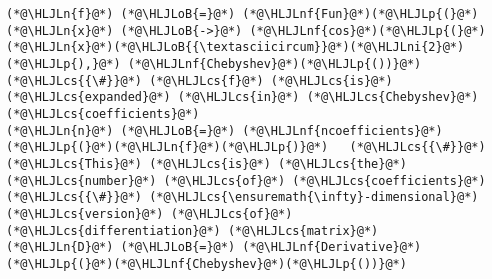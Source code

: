\documentclass[12pt,a4paper]{article}
\newcommand{\HLJLn}[1]{#1}
\newcommand{\HLJLnf}[1]{\textcolor[RGB]{66,102,213}{#1}}
\newcommand{\HLJLni}[1]{\textcolor[RGB]{59,151,46}{#1}}
\newcommand{\HLJLoB}[1]{\textcolor[RGB]{102,102,102}{\textbf{#1}}}
\newcommand{\HLJLp}[1]{#1}
\newcommand{\HLJLcs}[1]{\textcolor[RGB]{153,153,119}{\textit{#1}}}
\begin{document}
\begin{lstlisting}
(*@\HLJLn{f}@*) (*@\HLJLoB{=}@*) (*@\HLJLnf{Fun}@*)(*@\HLJLp{(}@*)(*@\HLJLn{x}@*) (*@\HLJLoB{->}@*) (*@\HLJLnf{cos}@*)(*@\HLJLp{(}@*)(*@\HLJLn{x}@*)(*@\HLJLoB{{\textasciicircum}}@*)(*@\HLJLni{2}@*)(*@\HLJLp{),}@*) (*@\HLJLnf{Chebyshev}@*)(*@\HLJLp{())}@*)   (*@\HLJLcs{{\#}}@*) (*@\HLJLcs{f}@*) (*@\HLJLcs{is}@*) (*@\HLJLcs{expanded}@*) (*@\HLJLcs{in}@*) (*@\HLJLcs{Chebyshev}@*) (*@\HLJLcs{coefficients}@*)
(*@\HLJLn{n}@*) (*@\HLJLoB{=}@*) (*@\HLJLnf{ncoefficients}@*)(*@\HLJLp{(}@*)(*@\HLJLn{f}@*)(*@\HLJLp{)}@*)   (*@\HLJLcs{{\#}}@*) (*@\HLJLcs{This}@*) (*@\HLJLcs{is}@*) (*@\HLJLcs{the}@*) (*@\HLJLcs{number}@*) (*@\HLJLcs{of}@*) (*@\HLJLcs{coefficients}@*)
(*@\HLJLcs{{\#}}@*) (*@\HLJLcs{\ensuremath{\infty}-dimensional}@*) (*@\HLJLcs{version}@*) (*@\HLJLcs{of}@*) (*@\HLJLcs{differentiation}@*) (*@\HLJLcs{matrix}@*)
(*@\HLJLn{D}@*) (*@\HLJLoB{=}@*) (*@\HLJLnf{Derivative}@*)(*@\HLJLp{(}@*)(*@\HLJLnf{Chebyshev}@*)(*@\HLJLp{())}@*)
\end{lstlisting}
\end{document}
